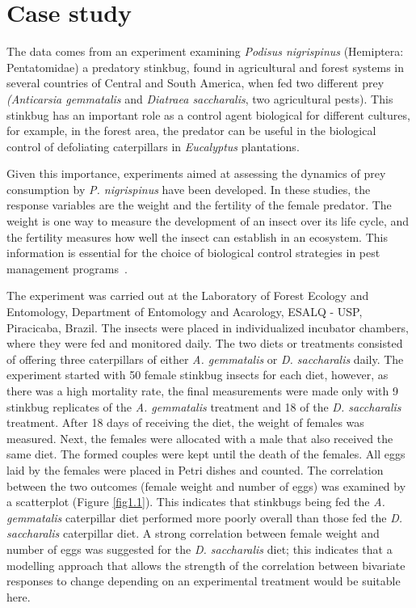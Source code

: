 \documentclass[useAMS,referee]{biom}
\begin{document}
\section{Case study}


The data comes from an experiment examining \textit{Podisus nigrispinus} (Hemiptera: Pentatomidae) a predatory stinkbug, found in agricultural and forest systems in several countries of Central and South America, when fed two different prey \textit{(Anticarsia gemmatalis} and \textit{Diatraea saccharalis}, two agricultural pests). 
This stinkbug has an important role as a control agent
biological for different cultures, for example, in the forest area, the predator can be useful in the biological control of defoliating caterpillars in \textit{Eucalyptus} plantations. 

Given this importance,  experiments aimed at assessing the dynamics of prey consumption by \textit{P. nigrispinus} have been developed. In these studies, the response variables are the weight and the fertility of the female predator. The weight is one way to measure the development of an insect over its life cycle, and the fertility measures how well the insect can establish in an ecosystem. This information is essential for the choice of biological control strategies in pest management programs~\citep{parra2002controle}. 

The experiment was carried out at the Laboratory of Forest Ecology and Entomology, Department of Entomology and Acarology, ESALQ - USP, Piracicaba, Brazil. The insects were placed in individualized incubator chambers, where they were fed and monitored daily.  The two diets or treatments consisted of offering three caterpillars of either  \textit{A. gemmatalis} or \textit{D. saccharalis} daily. The experiment started with 50 female stinkbug insects for each diet, however, as there was a high mortality rate, the final measurements were made only with 9 stinkbug replicates of the  \textit{A. gemmatalis} treatment and 18 of the \textit{D. saccharalis} treatment.  After 18 days of receiving the diet, the weight of females was measured. Next, the females were allocated with a male that also received the same diet. The formed couples were kept until the death of the females. All eggs laid by the females were placed in Petri dishes and counted. The correlation between the two outcomes (female weight and number of eggs) was examined by a scatterplot (Figure \ref{fig1.1}).
This indicates that stinkbugs being fed the \textit{A. gemmatalis} caterpillar diet performed more poorly overall than those fed the \textit{D. saccharalis} caterpillar diet. A strong correlation between female weight and number of eggs was suggested for the \textit{D. saccharalis} diet; this indicates that a modelling approach that allows the strength of the correlation between bivariate responses to change depending on an experimental treatment would be suitable here. 
\end{document}
